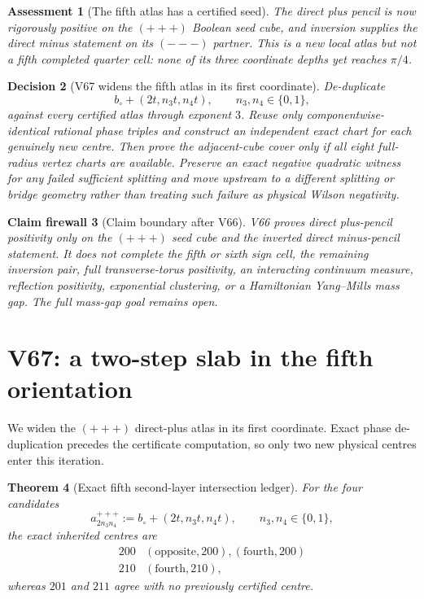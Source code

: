 \documentclass[11pt,oneside]{article}
\newtheorem{theorem}{Theorem}[section]
\newtheorem{assessment}[theorem]{Assessment}
\newtheorem{firewall}[theorem]{Claim firewall}
\newtheorem{decision}[theorem]{Decision}
\theoremstyle{definition}
\theoremstyle{remark}
\begin{document}
\begin{assessment}[The fifth atlas has a certified seed]
\label{ass:newv66}
The direct plus pencil is now rigorously positive on the
\((+++)\) Boolean seed cube, and inversion supplies the direct minus
statement on its \((---)\) partner.  This is a new local atlas but
not a fifth completed quarter cell: none of its three coordinate
depths yet reaches \(\pi/4\).
\end{assessment}

\begin{decision}[V67 widens the fifth atlas in its first coordinate]
\label{dec:newv66-next}
De-duplicate
\[
 b_\circ+(2t,n_3t,n_4t),\qquad n_3,n_4\in\{0,1\},    \tag{66.13}
\]
against every certified atlas through exponent \(3\).  Reuse only
componentwise-identical rational phase triples and construct an
independent exact chart for each genuinely new centre.  Then prove
the adjacent-cube cover only if all eight full-radius vertex charts
are available.  Preserve an exact negative quadratic witness for
any failed sufficient splitting and move upstream to a different
splitting or bridge geometry rather than treating such failure as
physical Wilson negativity.
\end{decision}

\begin{firewall}[Claim boundary after V66]
\label{fire:newv66-final}
V66 proves direct plus-pencil positivity only on the \((+++)\) seed
cube and the inverted direct minus-pencil statement.  It does not
complete the fifth or sixth sign cell, the remaining inversion
pair, full transverse-torus positivity, an interacting continuum
measure, reflection positivity, exponential clustering, or a
Hamiltonian Yang--Mills mass gap.  The full mass-gap goal remains
open.
\end{firewall}

\section{V67: a two-step slab in the fifth orientation}
\label{sec:newv67-fifth-two-step}

We widen the \((+++)\) direct-plus atlas in its first coordinate.
Exact phase de-duplication precedes the certificate computation, so
only two new physical centres enter this iteration.

\begin{theorem}[Exact fifth second-layer intersection ledger]
\label{thm:newv67-intersections}
For the four candidates
\[
 a_{2n_3n_4}^{+++}
 :=b_\circ+(2t,n_3t,n_4t),
 \qquad n_3,n_4\in\{0,1\},                            \tag{67.1}
\]
the exact inherited centres are
\[
\begin{array}{c|l}
200&(\mathrm{opposite},200),(\mathrm{fourth},200)\\
210&(\mathrm{fourth},210),
\end{array}                                           \tag{67.2}
\]
whereas \(201\) and \(211\) agree with no previously certified
centre.
\end{theorem}
\end{document}
